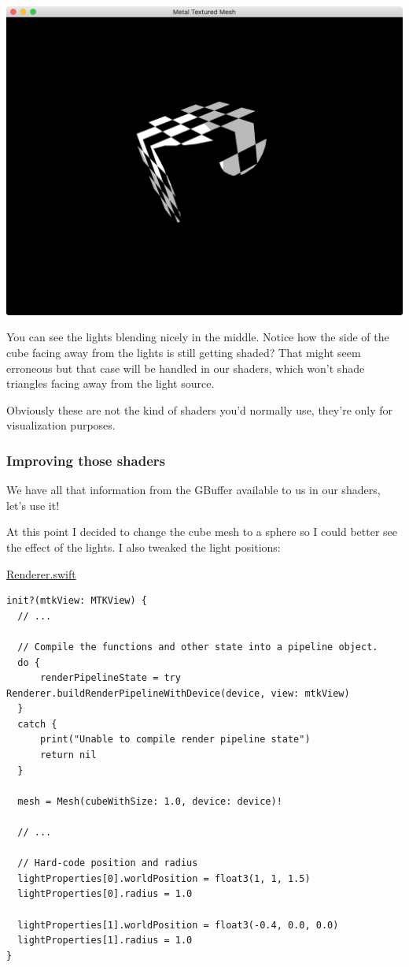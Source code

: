 \documentclass[11pt]{article}
\begin{document}
\begin{center}
\includegraphics[width=.9\linewidth]{../img/posts/implementing-deferred-shading-in-metal/lights-albedo.png}
\end{center}

You can see the lights blending nicely in the middle. Notice how the side of the
cube facing away from the lights is still getting shaded? That might seem
erroneous but that case will be handled in our shaders, which won't shade
triangles facing away from the light source.

Obviously these are not the kind of shaders you'd normally use, they're only for
visualization purposes.

\subsubsection*{Improving those shaders}
\label{sec:org4fb887b}

We have all that information from the GBuffer available to us in our shaders,
let's use it!

At this point I decided to change the cube mesh to a sphere so I could better
see the effect of the lights. I also tweaked the light positions:

\uline{Renderer.swift}
\begin{verbatim}
init?(mtkView: MTKView) {
  // ...

  // Compile the functions and other state into a pipeline object.
  do {
      renderPipelineState = try Renderer.buildRenderPipelineWithDevice(device, view: mtkView)
  }
  catch {
      print("Unable to compile render pipeline state")
      return nil
  }

  mesh = Mesh(cubeWithSize: 1.0, device: device)!

  // ...

  // Hard-code position and radius
  lightProperties[0].worldPosition = float3(1, 1, 1.5)
  lightProperties[0].radius = 1.0

  lightProperties[1].worldPosition = float3(-0.4, 0.0, 0.0)
  lightProperties[1].radius = 1.0
}
\end{verbatim}
\end{document}
